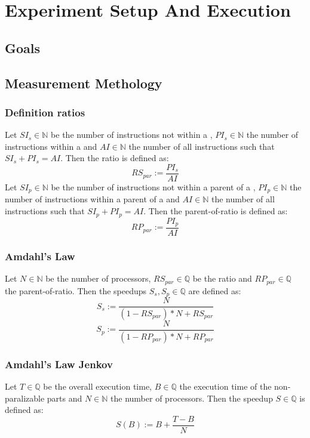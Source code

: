 \chapter{Experiment Setup And Execution}
\section{Goals}

\section{Measurement Methology}
\subsection{Definition ratios}
Let \(SI_s\in\mathbb{N}\) be the number of instructions not within a \scop, \(PI_s\in\mathbb{N}\) the number of instructions within a \scop and \(AI\in\mathbb{N}\) the number of all instructions such that \(SI_s + PI_s = AI\).
Then the \scop ratio is defined as:
\[RS_{par} := \frac{PI_s}{AI}\]
Let \(SI_p\in\mathbb{N}\) be the number of instructions not within a parent of a \scop, \(PI_p\in\mathbb{N}\) the number of instructions within a parent of a \scop and \(AI\in\mathbb{N}\) the number of all instructions such that \(SI_p + PI_p = AI\).
Then the parent-of-\scop ratio is defined as:
\[RP_{par} := \frac{PI_p}{AI}\]
\subsection[Amdahl's Law]{Amdahl's Law \cite{AmdahlsLaw}}
Let \(N\in\mathbb{N}\) be the number of processors, \(RS_{par}\in\mathbb{Q}\) be the \scops ratio and \(RP_{par}\in\mathbb{Q}\) the parent-of-\scop ratio.
Then the speedups \(S_s, S_p\in\mathbb{Q}\) are defined as:
\[S_s := \frac{N}{(1-RS_{par})*N+RS_{par}}\]
\[S_p := \frac{N}{(1-RP_{par})*N+RP_{par}}\]
\subsection[Amdahl's Law Jenkov]{Amdahl's Law Jenkov \cite{AmdahlsLawJenkov}}
Let \(T\in\mathbb{Q}\) be the overall execution time, \(B\in\mathbb{Q}\) the execution time of the non-paralizable parts and \(N\in\mathbb{N}\) the number of processors.
Then the speedup \(S\in\mathbb{Q}\) is defined as:
\[S(B) := B+\frac{T-B}{N}\]
